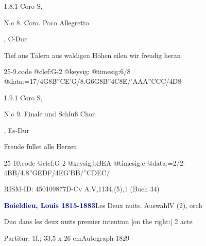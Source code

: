 \documentclass[a4paper, twocolumn, 11pt]{book}
\begin{document}
\newline %
\par 1.8.1  Coro S, \begin{itshape}N|o 8. Coro. Poco Allegretto\end{itshape}, C-Dur\newline \begin{footnotesize} Tief aus Tälern aus waldigen Höhen eilen wir freudig heran \end{footnotesize}  
\begin{filecontents*}{25-9.code}
@clef:G-2
@keysig:
@timesig:6/8
@data:=17/4G8B{''CE}'G/{8.G6G}8B''4C8E/'AAA''CCC/4D8-
\end{filecontents*}
\newline %
\par 1.9.1  Coro S, \begin{itshape}N|o 9. Finale und Schluß Chor.\end{itshape}, Es-Dur\newline \begin{footnotesize} Freude füllet alle Herzen \end{footnotesize}  
\begin{filecontents*}{25-10.code}
@clef:G-2
@keysig:bBEA
@timesig:c
@data:=2/2-4BB/4.8''GEDF/4EG'BB/''CDEC/
\end{filecontents*}
\newline %
\par RISM-ID: 450109877\newline D-Cv  A.V,1134,(5),1 (Buch 34)
\par \vspace{16pt} \textcolor{darkblue}{\textbf{Boieldieu, Louis  1815-1883}}\hfillplus{[26]}\newline Les Deux nuits. Auswahl\newline V (2), orch
\par \begin{itshape}[heading:] Duo dans les deux nuits premier intention [on the right:] 2 acte\end{itshape} 
\par \textcolor{darkblue}{}  Partitur: 1f.; 33,5 x 26 cm\newline Autograph  1829
\end{document}
